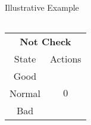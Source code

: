 \documentclass[usenames,dvipsnames,aspectratio=169,11pt, envcountsect]{beamer}
\begin{document}
\begin{frame}[noframenumbering]{Illustrative Example}
\begin{table}[H]
\begin{minipage}{0.29\textwidth}
\begin{tabular}{c | c}
			\end{tabular}
			\vspace{0.5cm} %
		\end{minipage}\hspace{0.5cm} %
		\begin{minipage}{0.29\textwidth}
			\centering
			\begin{tabular}{c | c}
				\multicolumn{2}{c}{\textbf{Not Check}} \\
				State  & Actions                       \\
				\hline
				Good   & \multirow{3}{*}{ \( 0 \)}     \\
				Normal &                               \\
				Bad    &                               \\
			\end{tabular}
			\vspace{0.5cm} %
		\end{minipage}
	\end{table}

\end{frame}
\end{document}
